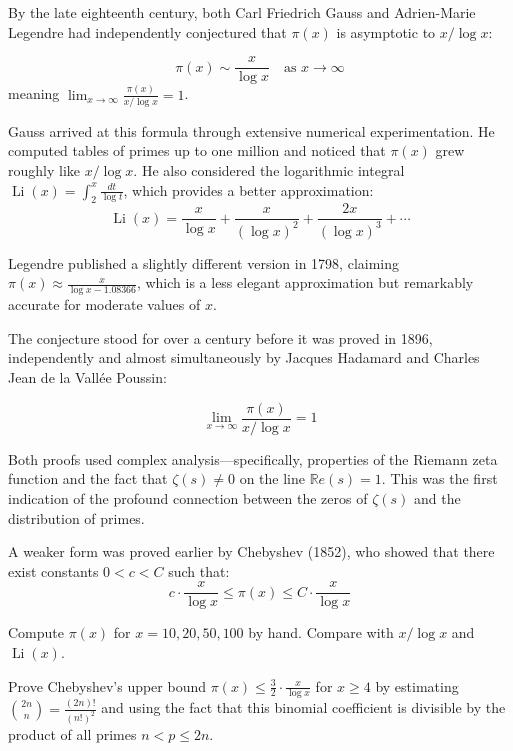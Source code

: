 By the late eighteenth century, both Carl Friedrich Gauss and Adrien-Marie Legendre had independently conjectured that $\pi(x)$ is asymptotic to $x / \log x$:

\begin{conjecture}
\label{conj:gauss}
\[
\pi(x) \sim \frac{x}{\log x} \quad \text{as } x \to \infty
\]
meaning $\displaystyle\lim_{x \to \infty} \frac{\pi(x)}{x / \log x} = 1$.
\end{conjecture}

Gauss arrived at this formula through extensive numerical experimentation. He computed tables of primes up to one million and noticed that $\pi(x)$ grew roughly like $x / \log x$. He also considered the logarithmic integral $\operatorname{Li}(x) = \int_2^x \frac{dt}{\log t}$, which provides a better approximation:
\[
\operatorname{Li}(x) = \frac{x}{\log x} + \frac{x}{(\log x)^2} + \frac{2x}{(\log x)^3} + \cdots
\]

Legendre published a slightly different version in 1798, claiming $\pi(x) \approx \frac{x}{\log x - 1.08366}$, which is a less elegant approximation but remarkably accurate for moderate values of $x$.

The conjecture stood for over a century before it was proved in 1896, independently and almost simultaneously by Jacques Hadamard and Charles Jean de la Vall\'{e}e Poussin:

\begin{theorem}
\label{thm:pnt}
\[
\lim_{x \to \infty} \frac{\pi(x)}{x / \log x} = 1
\]
\end{theorem}

Both proofs used complex analysis---specifically, properties of the Riemann zeta function and the fact that $\zeta(s) \neq 0$ on the line $\mathbb{R}e(s) = 1$. This was the first indication of the profound connection between the zeros of $\zeta(s)$ and the distribution of primes.

A weaker form was proved earlier by Chebyshev (1852), who showed that there exist constants $0 < c < C$ such that:
\[
c \cdot \frac{x}{\log x} \le \pi(x) \le C \cdot \frac{x}{\log x}
\]

\begin{exercise}
\label{ex:pi100}
Compute $\pi(x)$ for $x = 10, 20, 50, 100$ by hand. Compare with $x / \log x$ and $\operatorname{Li}(x)$.
\end{exercise}

\begin{exercise}
\label{ex:chebyshev}
Prove Chebyshev's upper bound $\pi(x) \le \frac{3}{2} \cdot \frac{x}{\log x}$ for $x \ge 4$ by estimating $\binom{2n}{n} = \frac{(2n)!}{(n!)^2}$ and using the fact that this binomial coefficient is divisible by the product of all primes $n < p \le 2n$.
\end{exercise}

